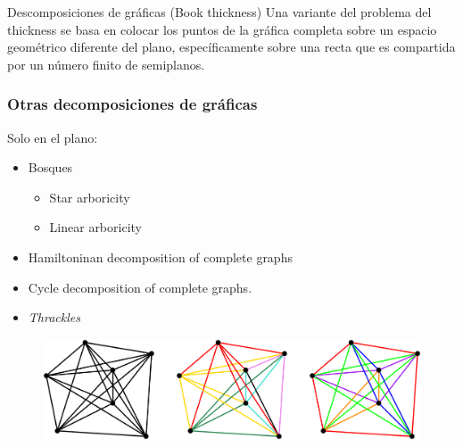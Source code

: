 \begin{frame}{Descomposiciones de gráficas (Book thickness)}
	Una variante del problema del thickness se basa en colocar los puntos de la gráfica completa sobre un espacio geométrico diferente del plano, específicamente sobre una recta que es compartida por un número finito de semiplanos. 
	\begin{center}
	\end{center}
\end{frame}
\begin{frame}
	\frametitle{Otras decomposiciones de gráficas}
	Solo en el plano:
	\begin{itemize}
		\item Bosques
		\begin{itemize}
			\item Star arboricity
			\item Linear arboricity
		\end{itemize}
		\item Hamiltoninan decomposition of complete graphs
		\item Cycle decomposition of complete graphs.
		\item \emph{Thrackles}
	\end{itemize}
	\begin{figure}
		\centering
		\includegraphics[width=1\linewidth]{images/other_decompositions}
	\end{figure}
\end{frame}

